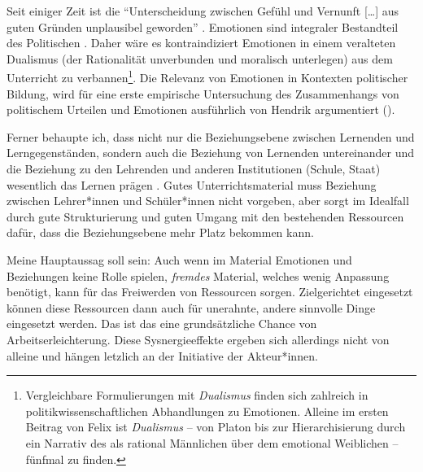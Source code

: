 Seit einiger Zeit ist die \enquote{Unterscheidung zwischen Gefühl und Vernunft [\dots] aus guten
Gründen unplausibel geworden} \autocite[][5]{Heidenreich.2012}. Emotionen sind integraler Bestandteil des Politischen \autocite[\gls{zb}][]{Heidenreich.2012a}. Daher wäre es kontraindiziert Emotionen in einem veralteten Dualismus (der Rationalität unverbunden und moralisch unterlegen) aus dem Unterricht zu verbannen\footnote{
    Vergleichbare Formulierungen mit \emph{Dualismus} finden sich zahlreich in politikwissenschaftlichen Abhandlungen zu Emotionen. Alleine im ersten Beitrag von Felix \textcite[9, 16, 17, 19, 25]{Heidenreich.2012a} ist \emph{Dualismus} -- von Platon bis zur Hierarchisierung durch ein Narrativ des als rational Männlichen über dem emotional Weiblichen  -- fünfmal zu finden. 
}. Die Relevanz von Emotionen in Kontexten politischer Bildung, wird für eine erste empirische Untersuchung des Zusammenhangs von politischem Urteilen und Emotionen ausführlich von Hendrik \citeauthor{Schroder.2020} argumentiert (\citeyear[zu Emotionen und Politik \gls{zb} die Kapitel 1.3.3, 1.3.4, 6 \& 7]{Schroder.2020}).  

Ferner behaupte ich, dass nicht nur die Beziehungsebene zwischen Lernenden und Lerngegenständen, sondern auch die Beziehung von Lernenden untereinander und die Beziehung zu den Lehrenden und anderen Institutionen (Schule, Staat) wesentlich das Lernen prägen \autocites(\gls{vgl} zu Beziehung \gls{zb})(){Kunkler2011}{Stratmann2021}.  
Gutes Unterrichtsmaterial muss Beziehung zwischen Lehrer*innen und Schüler*innen nicht vorgeben, aber sorgt im Idealfall durch gute Strukturierung und guten Umgang mit den bestehenden Ressourcen dafür, dass die Beziehungsebene mehr Platz bekommen kann.
\bigskip

Meine Hauptaussag soll sein: Auch wenn im Material Emotionen und Beziehungen keine Rolle spielen, \emph{fremdes} Material, welches wenig Anpassung benötigt, kann für das Freiwerden von Ressourcen sorgen. Zielgerichtet eingesetzt können diese Ressourcen dann auch für unerahnte, andere sinnvolle Dinge eingesetzt werden.
Das ist das eine grundsätzliche Chance von Arbeitserleichterung. Diese Sysnergieeffekte ergeben sich allerdings nicht von alleine und hängen letzlich an der Initiative der Akteur*innen. 





